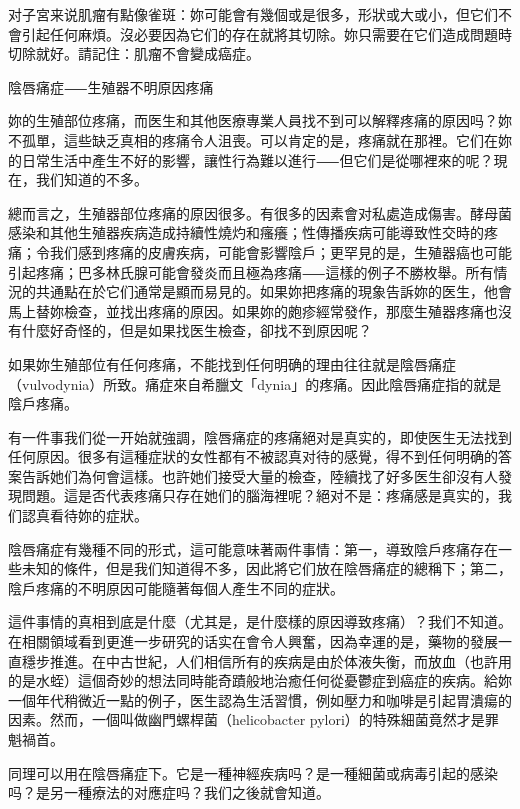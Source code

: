 \documentclass[12pt,UTF8]{ctexbook}
\begin{document}
对子宮来说肌瘤有點像雀斑：妳可能會有幾個或是很多，形狀或大或小，但它们不會引起任何麻煩。沒必要因為它们的存在就將其切除。妳只需要在它们造成問題時切除就好。請記住：肌瘤不會變成癌症。





陰唇痛症⸺生殖器不明原因疼痛




妳的生殖部位疼痛，而医生和其他医療專業人員找不到可以解釋疼痛的原因吗？妳不孤單，這些缺乏真相的疼痛令人沮喪。可以肯定的是，疼痛就在那裡。它们在妳的日常生活中產生不好的影響，讓性行為難以進行⸺但它们是從哪裡來的呢？現在，我们知道的不多。

總而言之，生殖器部位疼痛的原因很多。有很多的因素會对私處造成傷害。酵母菌感染和其他生殖器疾病造成持續性燒灼和瘙癢；性傳播疾病可能導致性交時的疼痛；令我们感到疼痛的皮膚疾病，可能會影響陰戶；更罕見的是，生殖器癌也可能引起疼痛；巴多林氏腺可能會發炎而且極為疼痛⸺這樣的例子不勝枚舉。所有情況的共通點在於它们通常是顯而易見的。如果妳把疼痛的現象告訴妳的医生，他會馬上替妳檢查，並找出疼痛的原因。如果妳的皰疹經常發作，那麼生殖器疼痛也沒有什麼好奇怪的，但是如果找医生檢查，卻找不到原因呢？

如果妳生殖部位有任何疼痛，不能找到任何明确的理由往往就是陰唇痛症（vulvodynia）所致。痛症來自希臘文「dynia」的疼痛。因此陰唇痛症指的就是陰戶疼痛。

有一件事我们從一开始就強調，陰唇痛症的疼痛絕对是真实的，即使医生无法找到任何原因。很多有這種症狀的女性都有不被認真对待的感覺，得不到任何明确的答案告訴她们為何會這樣。也許她们接受大量的檢查，陸續找了好多医生卻沒有人發現問題。這是否代表疼痛只存在她们的腦海裡呢？絕对不是：疼痛感是真实的，我们認真看待妳的症狀。

陰唇痛症有幾種不同的形式，這可能意味著兩件事情：第一，導致陰戶疼痛存在一些未知的條件，但是我们知道得不多，因此將它们放在陰唇痛症的總稱下；第二，陰戶疼痛的不明原因可能隨著每個人產生不同的症狀。

這件事情的真相到底是什麼（尤其是，是什麼樣的原因導致疼痛）？我们不知道。在相關領域看到更進一步研究的话实在會令人興奮，因為幸運的是，藥物的發展一直穩步推進。在中古世紀，人们相信所有的疾病是由於体液失衡，而放血（也許用的是水蛭）這個奇妙的想法同時能奇蹟般地治癒任何從憂鬱症到癌症的疾病。給妳一個年代稍微近一點的例子，医生認為生活習慣，例如壓力和咖啡是引起胃潰瘍的因素。然而，一個叫做幽門螺桿菌（helicobacter pylori）的特殊細菌竟然才是罪魁禍首。

同理可以用在陰唇痛症下。它是一種神經疾病吗？是一種細菌或病毒引起的感染吗？是另一種療法的对應症吗？我们之後就會知道。
\end{document}
